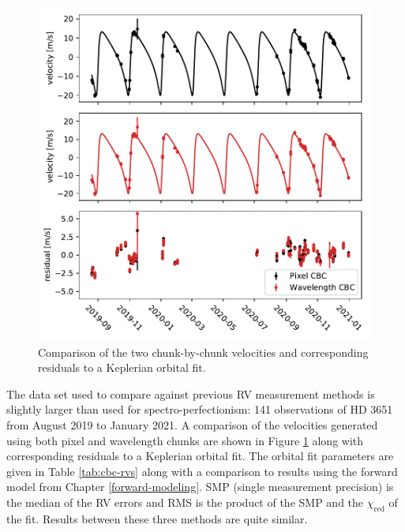 \begin{figure}
    \centering
    \includegraphics{figures-5/cbc-comparison.pdf}
    \caption[Keplerian orbital fit comparison between chunk methods]{Comparison of the two chunk-by-chunk velocities and corresponding residuals to a Keplerian orbital fit.}
    \label{fig:cbc-comparison}
\end{figure}

The data set used to compare against previous RV measurement methods is slightly larger than used for spectro-perfectionism: 141 observations of HD 3651 from August 2019 to January 2021. A comparison of the velocities generated using both pixel and wavelength chunks are shown in Figure \ref{fig:cbc-comparison} along with corresponding residuals to a Keplerian orbital fit. The orbital fit parameters are given in Table \ref{tab:cbc-rvs} along with a comparison to results using the forward model from Chapter \ref{forward-modeling}. SMP (single measurement precision) is the median of the RV errors and RMS is the product of the SMP and the $\chi_\mathrm{red}$ of the fit. Results between these three methods are quite similar.

